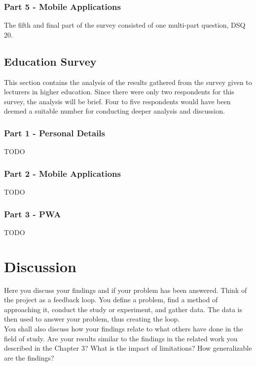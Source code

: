 \documentclass[a4paper,12pt]{article}
\begin{document}
\subsubsection{Part 5 - Mobile Applications}
\label{Analysis_devSurvey_part5}
The fifth and final part of the survey consisted of one multi-part question, DSQ 20.

\subsection{Education Survey}
\label{Analysis_eduSurvey}
This section contains the analysis of the results gathered from the survey given to lecturers in higher education. Since there were only two respondents for this survey, the analysis will be brief. Four to five respondents would have been deemed a suitable number for conducting deeper analysis and discussion.

\subsubsection{Part 1 - Personal Details}
\label{Analysis_eduSurvey_part1}
TODO

\subsubsection{Part 2 - Mobile Applications}
\label{Analysis_eduSurvey_part2}
TODO

\subsubsection{Part 3 - PWA}
\label{Analysis_eduSurvey_part3}
TODO

	
\newpage
	
\section{Discussion}
\label{Discussion}
Here you discuss your findings and if your problem has been answered. Think of the project as a feedback loop. You define a problem, find a method of approaching it, conduct the study or experiment, and gather data. The data is then used to answer your problem, thus creating the loop. \\

You shall also discuss how your findings relate to what others have done in the field of study. Are your results similar to the findings in the related work you described in the Chapter 3? What is the impact of limitations? How generalizable are the findings? \\
\end{document}
